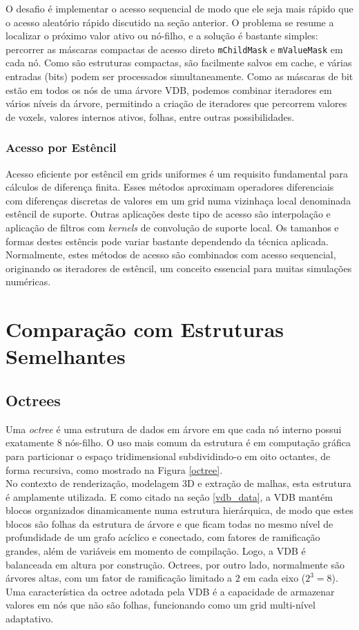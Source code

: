 \documentclass[12pt, a4paper, oneside]{book}
\begin{document}
O desafio é implementar o acesso sequencial de modo que ele seja mais rápido que o acesso aleatório rápido discutido na seção anterior. O problema se resume a localizar o próximo valor ativo ou nó-filho, e a solução é bastante simples: percorrer as máscaras compactas de acesso direto \texttt{mChildMask} e \texttt{mValueMask} em cada nó. Como são estruturas compactas, são facilmente salvos em cache, e várias entradas (bits) podem ser processados simultaneamente. Como as máscaras de bit estão em todos os nós de uma árvore VDB, podemos combinar iteradores em vários níveis da árvore, permitindo a criação de iteradores que percorrem valores de voxels, valores internos ativos, folhas, entre outras possibilidades.

\subsubsection{Acesso por Estêncil}
Acesso eficiente por estêncil em grids uniformes é um requisito fundamental para cálculos de diferença finita. Esses métodos aproximam operadores diferenciais com diferenças discretas de valores em um grid numa vizinhaça local denominada estêncil de suporte. Outras aplicações deste tipo de acesso são interpolação e aplicação de filtros com {\it kernels} de convolução de suporte local. Os tamanhos e formas destes estêncis pode variar bastante dependendo da técnica aplicada. Normalmente, estes métodos de acesso são combinados com acesso sequencial, originando os iteradores de estêncil, um conceito essencial para muitas simulações numéricas.



\section{Comparação com Estruturas Semelhantes}

\subsection{Octrees}
\label{octrees}

Uma \emph{octree} é uma estrutura de dados em árvore em que cada nó interno possui exatamente 8 nós-filho. O uso mais comum da estrutura é em computação gráfica para particionar o espaço tridimensional subdividindo-o em oito octantes, de forma recursiva, como mostrado na Figura \ref{octree}. \\

No contexto de renderização, modelagem 3D e extração de malhas, esta estrutura é amplamente utilizada. E como citado na seção \ref{vdb_data}, a VDB mantém blocos organizados dinamicamente numa estrutura hierárquica, de modo que estes blocos são folhas da estrutura de árvore e que ficam todas no mesmo nível de profundidade de um grafo acíclico e conectado, com fatores de ramificação grandes, além de variáveis em momento de compilação. Logo, a VDB é balanceada em altura por construção. Octrees, por outro lado, normalmente são árvores altas, com um fator de ramificação limitado a $2$ em cada eixo ($2^3 = 8$). 
Uma característica da octree adotada pela VDB é a capacidade de armazenar valores em nós que não são folhas, funcionando como um grid multi-nível adaptativo. 
\end{document}
